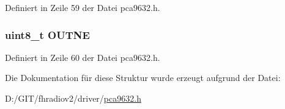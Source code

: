 Definiert in Zeile 59 der Datei pca9632.\+h.

\hypertarget{structpca9632__mode2_a2139d067da297c9598488f1d9332a6a7}{}
\subsubsection[{O\+U\+T\+N\+E}]{\setlength{\rightskip}{0pt plus 5cm}uint8\+\_\+t O\+U\+T\+N\+E}\label{structpca9632__mode2_a2139d067da297c9598488f1d9332a6a7}


Definiert in Zeile 60 der Datei pca9632.\+h.



Die Dokumentation für diese Struktur wurde erzeugt aufgrund der Datei\+:\begin{DoxyCompactItemize}
\item 
D\+:/\+G\+I\+T/fhradiov2/driver/\hyperlink{pca9632_8h}{pca9632.\+h}\end{DoxyCompactItemize}
